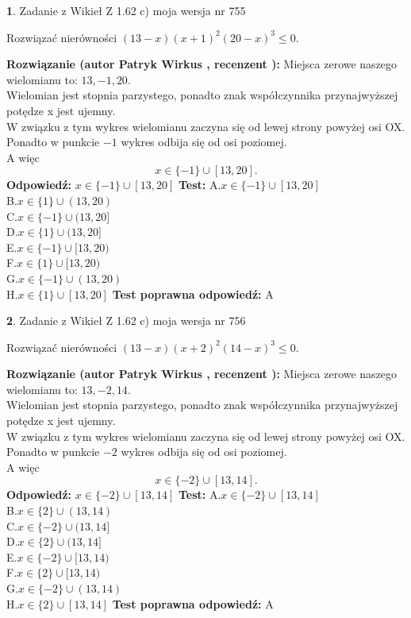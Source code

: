 \documentclass[12pt, a4paper]{article}
\theoremstyle{definition} %
\newtheorem{zad}{}
\newcommand{\zadStart}[1]{\begin{zad}#1\newline}
\newcommand{\zadStop}{\end{zad}}
\newcommand{\rozwStart}[2]{\noindent \textbf{Rozwiązanie (autor #1 , recenzent #2): }\newline}
\newcommand{\rozwStop}{\newline}
\newcommand{\odpStart}{\noindent \textbf{Odpowiedź:}\newline}
\newcommand{\odpStop}{\newline}
\newcommand{\testStart}{\noindent \textbf{Test:}\newline}
\newcommand{\testStop}{\newline}
\newcommand{\kluczStart}{\noindent \textbf{Test poprawna odpowiedź:}\newline}
\newcommand{\kluczStop}{\newline}
\begin{document}
\zadStart{Zadanie z Wikieł Z 1.62 c) moja wersja nr 755}

Rozwiązać nierówności $(13-x)(x+1)^{2}(20-x)^{3}\le0$.
\zadStop
\rozwStart{Patryk Wirkus}{}
Miejsca zerowe naszego wielomianu to: $13, -1, 20$.\\
Wielomian jest stopnia parzystego, ponadto znak współczynnika przy\linebreak najwyższej potędze x jest ujemny.\\ W związku z tym wykres wielomianu zaczyna się od lewej strony powyżej osi OX.\\
Ponadto w punkcie $-1$ wykres odbija się od osi poziomej.\\
A więc $$x \in \{-1\} \cup [13,20].$$
\rozwStop
\odpStart
$x \in \{-1\} \cup [13,20]$
\odpStop
\testStart
A.$x \in \{-1\} \cup [13,20]$\\
B.$x \in \{1\} \cup (13,20)$\\
C.$x \in \{-1\} \cup (13,20]$\\
D.$x \in \{1\} \cup (13,20]$\\
E.$x \in \{-1\} \cup [13,20)$\\
F.$x \in \{1\} \cup [13,20)$\\
G.$x \in \{-1\} \cup (13,20)$\\
H.$x \in \{1\} \cup [13,20]$
\testStop
\kluczStart
A
\kluczStop



\zadStart{Zadanie z Wikieł Z 1.62 c) moja wersja nr 756}

Rozwiązać nierówności $(13-x)(x+2)^{2}(14-x)^{3}\le0$.
\zadStop
\rozwStart{Patryk Wirkus}{}
Miejsca zerowe naszego wielomianu to: $13, -2, 14$.\\
Wielomian jest stopnia parzystego, ponadto znak współczynnika przy\linebreak najwyższej potędze x jest ujemny.\\ W związku z tym wykres wielomianu zaczyna się od lewej strony powyżej osi OX.\\
Ponadto w punkcie $-2$ wykres odbija się od osi poziomej.\\
A więc $$x \in \{-2\} \cup [13,14].$$
\rozwStop
\odpStart
$x \in \{-2\} \cup [13,14]$
\odpStop
\testStart
A.$x \in \{-2\} \cup [13,14]$\\
B.$x \in \{2\} \cup (13,14)$\\
C.$x \in \{-2\} \cup (13,14]$\\
D.$x \in \{2\} \cup (13,14]$\\
E.$x \in \{-2\} \cup [13,14)$\\
F.$x \in \{2\} \cup [13,14)$\\
G.$x \in \{-2\} \cup (13,14)$\\
H.$x \in \{2\} \cup [13,14]$
\testStop
\kluczStart
A
\kluczStop
\end{document}
